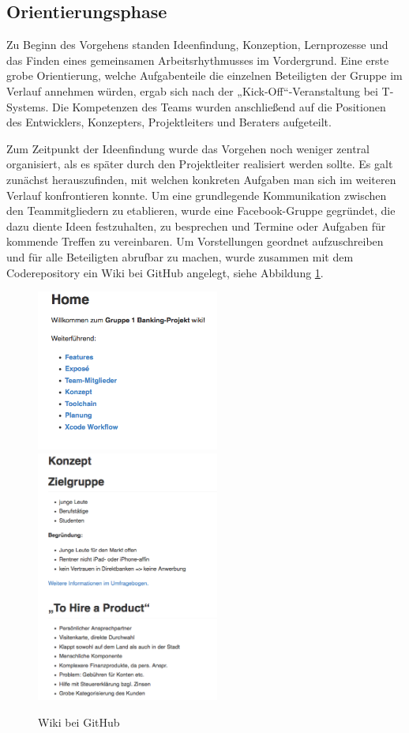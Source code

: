\subsection{Orientierungsphase}
	Zu Beginn des Vorgehens standen Ideenfindung, Konzeption, Lernprozesse und das Finden eines gemeinsamen Arbeitsrhythmusses im Vordergrund. Eine erste grobe Orientierung, welche Aufgabenteile die einzelnen Beteiligten der Gruppe im Verlauf annehmen würden, ergab sich nach der „Kick-Off“-Veranstaltung bei T-Systems. Die Kompetenzen des Teams wurden anschließend auf die Positionen des Entwicklers, Konzepters, Projektleiters und Beraters aufgeteilt. 
	
	Zum Zeitpunkt der Ideenfindung wurde das Vorgehen noch weniger zentral organisiert, als es später durch den Projektleiter realisiert werden sollte. Es galt zunächst herauszufinden, mit welchen konkreten Aufgaben man sich im weiteren Verlauf konfrontieren konnte. Um eine grundlegende Kommunikation zwischen den Teammitgliedern zu etablieren, wurde eine Facebook-Gruppe gegründet, die dazu diente Ideen festzuhalten, zu besprechen und Termine oder Aufgaben für kommende Treffen zu vereinbaren. Um Vorstellungen geordnet aufzuschreiben und für alle Beteiligten abrufbar zu machen, wurde zusammen mit dem Coderepository ein Wiki bei GitHub angelegt, siehe Abbildung \ref{fig:WikiHome}.
	
\begin{figure}[h]
	\centering
	\includegraphics[width=6cm]{Pictures/wiki_home}
	\includegraphics[width=6cm]{Pictures/wiki-konzept}
	\caption{Wiki bei GitHub\label{fig:WikiHome}}
\end{figure}

